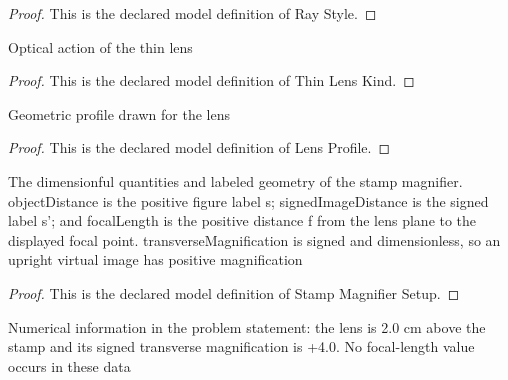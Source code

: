 \begin{proof}
  This is the declared model definition of Ray Style.
\end{proof}
\begin{definition}
  \label{def:physics:phyx-mini-0058:phyxminiproblems-problemphyxmini0058-thinlenskind}
  Optical action of the thin lens
\end{definition}
\begin{proof}
  This is the declared model definition of Thin Lens Kind.
\end{proof}
\begin{definition}
  \label{def:physics:phyx-mini-0058:phyxminiproblems-problemphyxmini0058-lensprofile}
  Geometric profile drawn for the lens
\end{definition}
\begin{proof}
  This is the declared model definition of Lens Profile.
\end{proof}
\begin{definition}
  \label{def:physics:phyx-mini-0058:phyxminiproblems-problemphyxmini0058-stampmagnifiersetup}
  The dimensionful quantities and labeled geometry of the stamp magnifier. objectDistance is the positive figure label s; signedImageDistance is the signed label s'; and focalLength is the positive distance f from the lens plane to the displayed focal point. transverseMagnification is signed and dimensionless, so an upright virtual image has positive magnification
\end{definition}
\begin{proof}
  This is the declared model definition of Stamp Magnifier Setup.
\end{proof}
\begin{definition}
  \label{def:physics:phyx-mini-0058:phyxminiproblems-problemphyxmini0058-matchesproblemreadouts}
  Numerical information in the problem statement: the lens is 2.0 cm above the stamp and its signed transverse magnification is +4.0. No focal-length value occurs in these data
\end{definition}
